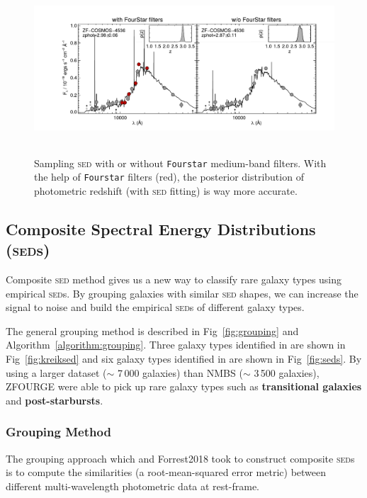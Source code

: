 \documentclass{ar-1col}
\begin{document}
\begin{figure}
    \includegraphics[width=6in, height=2.5in]{images/z_photo_better.pdf}
    \caption{Sampling \textsc{sed} with or without \texttt{Fourstar} medium-band filters. With the help of \texttt{Fourstar} filters (red), the posterior distribution of photometric redshift (with \textsc{sed} fitting) is way more accurate.}
    \label{fig:z_photo}
\end{figure}

\subsection{Composite Spectral Energy Distributions (\textsc{sed}s)}

Composite \textsc{sed} method gives us a new way to classify rare galaxy types using empirical \textsc{sed}s.
By grouping galaxies with similar \textsc{sed} shapes, we can increase the signal to noise and build the empirical \textsc{sed}s of different galaxy types.

The general grouping method is described in Fig~\ref{fig:grouping} and Algorithm~\ref{algorithm:grouping}. 
Three galaxy types identified in \citet{Kriek2011} are shown in Fig~\ref{fig:kreiksed} and six galaxy types identified in \citet{Forrest2018} are shown in Fig~\ref{fig:seds}. 
By using a larger dataset ($\sim$ 7\,000 galaxies) than NMBS ($\sim$ 3\,500 galaxies), ZFOURGE were able to pick up rare galaxy types such as \textbf{transitional galaxies} and \textbf{post-starbursts}.


\subsubsection{Grouping Method}
 
The grouping approach which \citet{Kriek2011} and {Forrest2018} took to construct composite \textsc{sed}s is to compute the similarities (a root-mean-squared error metric) between different multi-wavelength photometric data at rest-frame.
\end{document}
